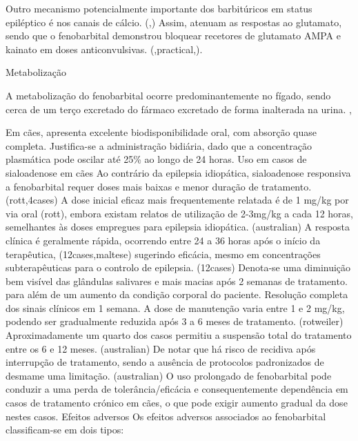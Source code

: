 Outro mecanismo potencialmente importante dos barbitúricos em status epiléptico é nos canais de cálcio. (\cite{Trinka2023},\cite{Bersan2014}) Assim, atenuam as respostas ao glutamato, sendo que o fenobarbital demonstrou bloquear recetores de glutamato AMPA e kainato em doses anticonvulsivas. (\cite{mechanism},practical,\cite{Bersan2014}).


Metabolização


A metabolização do fenobarbital ocorre predominantemente no fígado, sendo cerca de um terço excretado do fármaco excretado de forma inalterada na urina. \cite{Trinka2023},\cite{Podell2016}


Em cães, apresenta excelente biodisponibilidade oral, com absorção quase completa. \cite{Jukier2023} Justifica-se a administração bidiária, dado que a concentração plasmática pode oscilar até 25\% ao longo de 24 horas. \cite{Jukier2023}
Uso em casos de sialoadenose em cães
Ao contrário da epilepsia idiopática, sialoadenose responsiva a fenobarbital requer doses mais baixas e menor duração de tratamento. (rott,4cases) A dose inicial eficaz mais frequentemente relatada é de 1 mg/kg por via oral (rott), embora existam relatos de utilização de 2-3mg/kg a cada 12 horas, semelhantes às doses empregues para epilepsia idiopática.  (australian) 
A resposta clínica é geralmente rápida, ocorrendo entre 24 a 36 horas após o início da terapêutica, (12cases,maltese) sugerindo eficácia, mesmo em concentrações subterapêuticas para o controlo de epilepsia. (12cases) Denota-se uma diminuição bem visível das glândulas salivares e mais macias após 2 semanas de tratamento. para além de um aumento da condição corporal do paciente. Resolução completa dos sinais clínicos em 1 semana.
A dose de manutenção varia entre 1 e 2 mg/kg, podendo ser gradualmente reduzida após 3 a 6 meses de tratamento. (rotweiler) Aproximadamente um quarto dos casos permitiu a suspensão total do tratamento entre os 6 e 12 meses. (australian)
De notar que há risco de recidiva após interrupção de tratamento, sendo a ausência de protocolos padronizados de desmame uma limitação. (australian) O uso prolongado de fenobarbital pode conduzir a uma perda de tolerância/eficácia e consequentemente dependência em casos de tratamento crónico em cães, o que pode exigir aumento gradual da dose nestes casos. 
Efeitos adversos
Os efeitos adversos associados ao fenobarbital classificam-se em dois tipos: \cite{Bersan2014}\cite{10.11}

